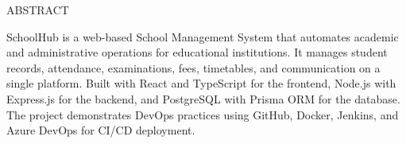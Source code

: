ABSTRACT

SchoolHub is a web-based School Management System that automates academic and administrative operations for educational institutions. It manages student records, attendance, examinations, fees, timetables, and communication on a single platform. Built with React and TypeScript for the frontend, Node.js with Express.js for the backend, and PostgreSQL with Prisma ORM for the database. The project demonstrates DevOps practices using GitHub, Docker, Jenkins, and Azure DevOps for CI/CD deployment.
